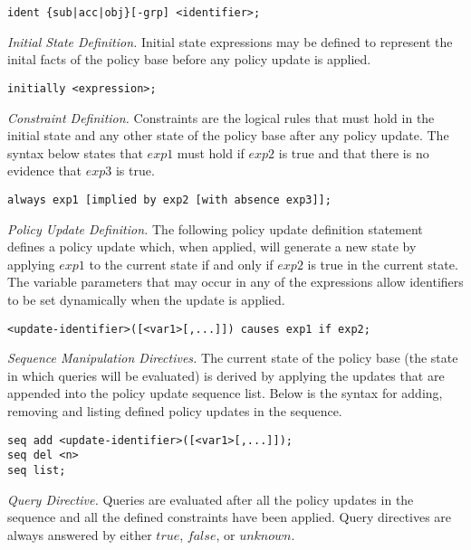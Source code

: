 \documentclass{llncs}
\begin{document}
    \begin{verbatim}ident {sub|acc|obj}[-grp] <identifier>;\end{verbatim}

    \noindent
    \emph{Initial State Definition.} Initial state expressions may be defined
    to represent the inital facts of the policy base before any policy update
    is applied.

    \begin{verbatim}initially <expression>;\end{verbatim}

    \noindent
    \emph{Constraint Definition.} Constraints are the logical rules that must
    hold in the initial state and any other state of the policy base after
    any policy update. The syntax below states that $exp1$ must hold if
    $exp2$ is true and that there is no evidence that $exp3$ is true.

    \begin{verbatim}always exp1 [implied by exp2 [with absence exp3]];\end{verbatim}

    \noindent
    \emph{Policy Update Definition.} The following policy update definition
    statement defines a policy update which, when applied, will generate a new
    state by applying $exp1$ to the current state if and only if $exp2$ is
    true in the current state. The variable parameters that may occur in any
    of the expressions allow identifiers to be set dynamically when the update
    is applied.

    \begin{verbatim}<update-identifier>([<var1>[,...]]) causes exp1 if exp2;\end{verbatim}

    \noindent
    \emph{Sequence Manipulation Directives.} The current state of the policy
    base (the state in which queries will be evaluated) is derived by applying
    the updates that are appended into the policy update sequence list. Below
    is the syntax for adding, removing and listing defined policy updates in
    the sequence.

\begin{verbatim}
seq add <update-identifier>([<var1>[,...]]);
seq del <n>
seq list;
\end{verbatim}

    \noindent
    \emph{Query Directive.} Queries are evaluated after all the policy
    updates in the sequence and all the defined constraints have been
    applied. Query directives are always answered by either $true$,
    $false$, or $unknown$.
\end{document}
